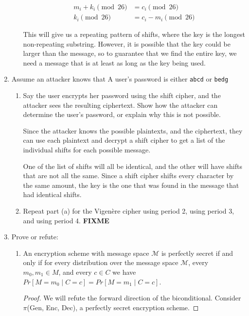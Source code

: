 \documentclass{article}
\begin{document}
\begin{enumerate}
\begin{enumerate}
        \begin{align*}
          m_i + k_i \pmod{26} &= c_i \pmod{26}\\
          k_i \pmod{26} &= c_i - m_i \pmod{26}
        \end{align*}

        This will give us a repeating pattern of shifts, where the key is the
        longest non-repeating substring. However, it is possible that the key
        could be larger than the message, so to guarantee that we find the
        entire key, we need a message that is at least as long as the key being
        used.
    \end{enumerate}

  \item Assume an attacker knows that A user's password is either
    \verb|abcd| or \verb|bedg|
    \begin{enumerate}
      \item Say the user encrypts her password using the shift cipher, and the 
        attacker sees the resulting ciphertext. Show how the attacker can 
        determine the user’s password, or explain why this is not possible.

        Since the attacker knows the possible plaintexts, and the ciphertext,
        they can use each plaintext and decrypt a shift cipher to get a list of
        the individual shifts for each possible message.

        One of the list of shifts will all be identical, and the other will have
        shifts that are not all the same. Since a shift cipher shifts every
        character by the same amount, the key is the one that was found in the
        message that had identical shifts.

      \item Repeat part (a) for the Vigen\`ere cipher using period 2, using 
        period 3, and using period 4. \textbf{FIXME}
    \end{enumerate}
  \item Prove or refute:
    \begin{enumerate}
      \item An encryption scheme with message space $\mathcal{M}$ is perfectly
        secret if and only if for every distribution over the message space 
        $\mathcal{M}$, every $m_0, m_1 \in M$, and every $c \in C$ we have 
        $Pr\left[M = m_0 \mid C = c\right] = Pr\left[M = m_1 \mid C = c\right]$.

        \begin{proof}
        We will refute the forward direction of the biconditional. Consider $\pi$(Gen, Enc, Dec), a perfectly secret encryption scheme. \newline


\end{proof}
\end{enumerate}
\end{enumerate}
\end{document}
